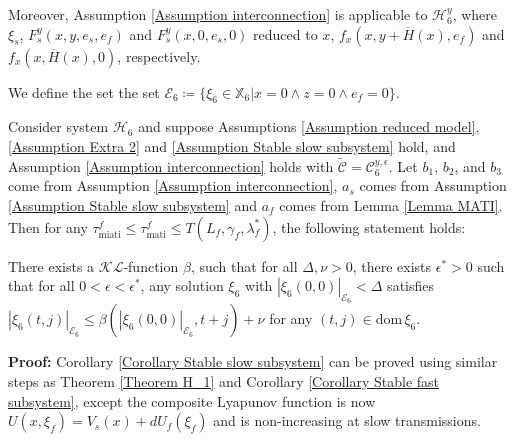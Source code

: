 Moreover, Assumption \ref{Assumption interconnection} is applicable to $\mathcal{H}_6^y$, where $\xi_s$, $F_s^y(x,y,e_s,e_f)$ and $F_s^y(x,0,e_s,0)$ reduced to $x$, $f_x(x,y+\overline{H}(x),e_f)$ and $f_x(x,\overline{H}(x),0)$, respectively.



We define the set the set $\mathcal{E}_6 \coloneqq \{\xi_6 \in \mathbb{X}_6 | x=0 \wedge z = 0 \wedge e_f=0 \}$.
\begin{cor}
    Consider system $\mathcal{H}_6$ and suppose Assumptions \ref{Assumption reduced model}, \ref{Assumption Extra 2} and \ref{Assumption Stable slow subsystem} hold, and Assumption \ref{Assumption interconnection} holds with $\widetilde{\mathcal{C}} = \mathcal{C}_6^{y,\epsilon}$.
    Let $b_1$, $b_2$, and $b_3$ come from Assumption \ref{Assumption interconnection}, $a_s$ comes from Assumption \ref{Assumption Stable slow subsystem} and $a_f$ comes from Lemma \ref{Lemma MATI}. Then for any $\tau_{\text{miati}}^f \leq \tau_{\text{mati}}^f \leq T(L_f, \gamma_f, \lambda_f^*)$, the following statement holds:

    There exists a $\mathcal{KL}$-function $\beta$, such that for all $\Delta,\nu>0$, there exists $\epsilon^* >0$ such that for all $0<\epsilon<\epsilon^*$, any solution $\xi_6$ with $ |\xi_6(0,0)|_{\mathcal{E}_6}<\Delta$ satisfies $|\xi_6(t,j)|_{\mathcal{E}_6} \leq \beta(|\xi_6(0,0)|_{\mathcal{E}_6}, t+j) + \nu$ for any $(t,j)\in \text{dom} \, \xi_6$.
    
    \label{Corollary Stable slow subsystem}
\end{cor}
\textbf{Proof:}
    Corollary \ref{Corollary Stable slow subsystem} can be proved using similar steps as Theorem \ref{Theorem H_1} and Corollary \ref{Corollary Stable fast subsystem}, except the composite Lyapunov function is now $U(x,\xi_f) = V_s(x) + dU_f(\xi_f) $ and is non-increasing at slow transmissions.

    
